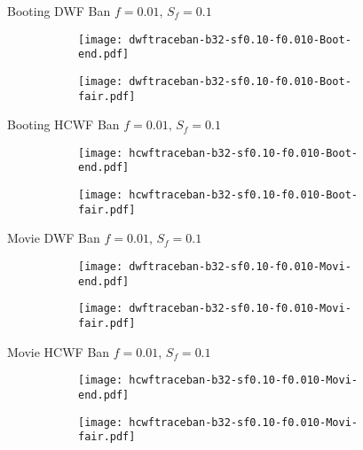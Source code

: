 \documentclass[10pt,a4paper]{beamer}
\begin{document}
\begin{frame}{Booting DWF Ban $f=0.01,\, S_f=0.1$}
	\begin{figure}
		\begin{subfigure}{.48\textwidth}
			\centering
			\texttt{[image: dwftraceban-b32-sf0.10-f0.010-Boot-end.pdf]}
		\end{subfigure}
		\begin{subfigure}{.48\textwidth}
			\centering
			\texttt{[image: dwftraceban-b32-sf0.10-f0.010-Boot-fair.pdf]}
		\end{subfigure}
	\end{figure}
\end{frame}
\begin{frame}{Booting HCWF Ban $f=0.01,\, S_f=0.1$}
	\begin{figure}
	\begin{subfigure}{.48\textwidth}
		\centering
		\texttt{[image: hcwftraceban-b32-sf0.10-f0.010-Boot-end.pdf]}
	\end{subfigure}
	\begin{subfigure}{.48\textwidth}
		\centering
		\texttt{[image: hcwftraceban-b32-sf0.10-f0.010-Boot-fair.pdf]}
	\end{subfigure}
	\end{figure}
\end{frame}
\begin{frame}{Movie DWF Ban $f=0.01,\, S_f=0.1$}
	\begin{figure}
		\begin{subfigure}{.48\textwidth}
			\centering
			\texttt{[image: dwftraceban-b32-sf0.10-f0.010-Movi-end.pdf]}
		\end{subfigure}
		\begin{subfigure}{.48\textwidth}
			\centering
			\texttt{[image: dwftraceban-b32-sf0.10-f0.010-Movi-fair.pdf]}
		\end{subfigure}
	\end{figure}
\end{frame}
\begin{frame}{Movie HCWF Ban $f=0.01,\, S_f=0.1$}	
	\begin{figure}
		\begin{subfigure}{.48\textwidth}
			\centering
			\texttt{[image: hcwftraceban-b32-sf0.10-f0.010-Movi-end.pdf]}
		\end{subfigure}
		\begin{subfigure}{.48\textwidth}
			\centering
			\texttt{[image: hcwftraceban-b32-sf0.10-f0.010-Movi-fair.pdf]}
		\end{subfigure}
	\end{figure}
\end{frame}
\end{document}
